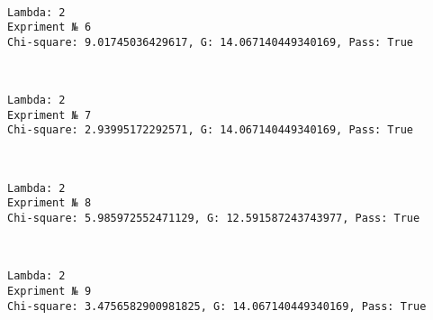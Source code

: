 \documentclass[11pt]{article}
\begin{document}
    \begin{center}
    \end{center}
    { \hspace*{\fill} \\}
    
    \begin{Verbatim}[commandchars=\\\{\}]
Lambda: 2
Expriment № 6
Chi-square: 9.01745036429617, G: 14.067140449340169, Pass: True
    \end{Verbatim}

    \begin{center}
    \end{center}
    { \hspace*{\fill} \\}
    
    \begin{Verbatim}[commandchars=\\\{\}]
Lambda: 2
Expriment № 7
Chi-square: 2.93995172292571, G: 14.067140449340169, Pass: True
    \end{Verbatim}

    \begin{center}
    \end{center}
    { \hspace*{\fill} \\}
    
    \begin{Verbatim}[commandchars=\\\{\}]
Lambda: 2
Expriment № 8
Chi-square: 5.985972552471129, G: 12.591587243743977, Pass: True
    \end{Verbatim}

    \begin{center}
    \end{center}
    { \hspace*{\fill} \\}
    
    \begin{Verbatim}[commandchars=\\\{\}]
Lambda: 2
Expriment № 9
Chi-square: 3.4756582900981825, G: 14.067140449340169, Pass: True
    \end{Verbatim}
\end{document}
